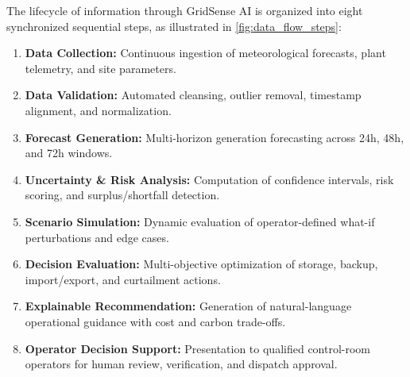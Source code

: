 The lifecycle of information through GridSense AI is organized into eight synchronized sequential steps, as illustrated in \cref{fig:data_flow_steps}:
\begin{enumerate}[leftmargin=1.8em, itemsep=0.2em]
    \item \textbf{Data Collection:} Continuous ingestion of meteorological forecasts, plant telemetry, and site parameters.
    \item \textbf{Data Validation:} Automated cleansing, outlier removal, timestamp alignment, and normalization.
    \item \textbf{Forecast Generation:} Multi-horizon generation forecasting across 24h, 48h, and 72h windows.
    \item \textbf{Uncertainty \& Risk Analysis:} Computation of confidence intervals, risk scoring, and surplus/shortfall detection.
    \item \textbf{Scenario Simulation:} Dynamic evaluation of operator-defined what-if perturbations and edge cases.
    \item \textbf{Decision Evaluation:} Multi-objective optimization of storage, backup, import/export, and curtailment actions.
    \item \textbf{Explainable Recommendation:} Generation of natural-language operational guidance with cost and carbon trade-offs.
    \item \textbf{Operator Decision Support:} Presentation to qualified control-room operators for human review, verification, and dispatch approval.
\end{enumerate}

